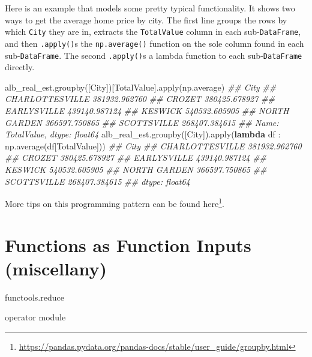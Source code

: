 \documentclass[
  12pt,
]{krantz}
\makeatletter
\newenvironment{Shaded}{\begin{snugshade}}{\end{snugshade}}
\newcommand{\BuiltInTok}[1]{#1}
\newcommand{\CommentTok}[1]{\textcolor[rgb]{0.37,0.37,0.37}{\textit{#1}}}
\newcommand{\KeywordTok}[1]{\textcolor[rgb]{0.27,0.27,0.27}{\textbf{#1}}}
\newcommand{\NormalTok}[1]{#1}
\newcommand{\StringTok}[1]{\textcolor[rgb]{0.5,0.5,0.5}{#1}}
\renewcommand{\href}[2]{#2\footnote{\url{#1}}}
\newenvironment{kframe}{%
\medskip{}
\setlength{\fboxsep}{.8em}
 \def\at@end@of@kframe{}%
 \ifinner\ifhmode%
  \def\at@end@of@kframe{\end{minipage}}%
  \begin{minipage}{\columnwidth}%
 \fi\fi%
 \def\FrameCommand##1{\hskip\@totalleftmargin \hskip-\fboxsep
 \colorbox{shadecolor}{##1}\hskip-\fboxsep
     \hskip-\linewidth \hskip-\@totalleftmargin \hskip\columnwidth}%
 \MakeFramed {\advance\hsize-\width
   \@totalleftmargin\z@ \linewidth\hsize
   \@setminipage}}%
 {\par\unskip\endMakeFramed%
 \at@end@of@kframe}
\renewenvironment{Shaded}{\begin{kframe}}{\end{kframe}}
\makeatother
\begin{document}
Here is an example that models some pretty typical functionality. It shows two ways to get the average home price by city. The first line groups the rows by which \texttt{City} they are in, extracts the \texttt{TotalValue} column in each sub-\texttt{DataFrame}, and then \texttt{.apply()}s the \texttt{np.average()} function on the sole column found in each sub-\texttt{DataFrame}. The second \texttt{.apply()}s a lambda function to each sub-\texttt{DataFrame} directly.

\begin{Shaded}
\begin{Highlighting}[]
\NormalTok{alb\_real\_est.groupby([}\StringTok{\textquotesingle{}City\textquotesingle{}}\NormalTok{])[}\StringTok{\textquotesingle{}TotalValue\textquotesingle{}}\NormalTok{].}\BuiltInTok{apply}\NormalTok{(np.average)}
\CommentTok{\#\# City}
\CommentTok{\#\# CHARLOTTESVILLE    381932.962760}
\CommentTok{\#\# CROZET             380425.678927}
\CommentTok{\#\# EARLYSVILLE        439140.987124}
\CommentTok{\#\# KESWICK            540532.605905}
\CommentTok{\#\# NORTH GARDEN       366597.750865}
\CommentTok{\#\# SCOTTSVILLE        268407.384615}
\CommentTok{\#\# Name: TotalValue, dtype: float64}
\NormalTok{alb\_real\_est.groupby([}\StringTok{\textquotesingle{}City\textquotesingle{}}\NormalTok{]).}\BuiltInTok{apply}\NormalTok{(}\KeywordTok{lambda}\NormalTok{ df : np.average(df[}\StringTok{\textquotesingle{}TotalValue\textquotesingle{}}\NormalTok{]))}
\CommentTok{\#\# City}
\CommentTok{\#\# CHARLOTTESVILLE    381932.962760}
\CommentTok{\#\# CROZET             380425.678927}
\CommentTok{\#\# EARLYSVILLE        439140.987124}
\CommentTok{\#\# KESWICK            540532.605905}
\CommentTok{\#\# NORTH GARDEN       366597.750865}
\CommentTok{\#\# SCOTTSVILLE        268407.384615}
\CommentTok{\#\# dtype: float64}
\end{Highlighting}
\end{Shaded}

More tips on this programming pattern can be found \href{https://pandas.pydata.org/pandas-docs/stable/user_guide/groupby.html}{here}.

\hypertarget{functions-as-function-inputs-miscellany}{%
\section{Functions as Function Inputs (miscellany)}\label{functions-as-function-inputs-miscellany}}

functools.reduce

operator module
\end{document}

